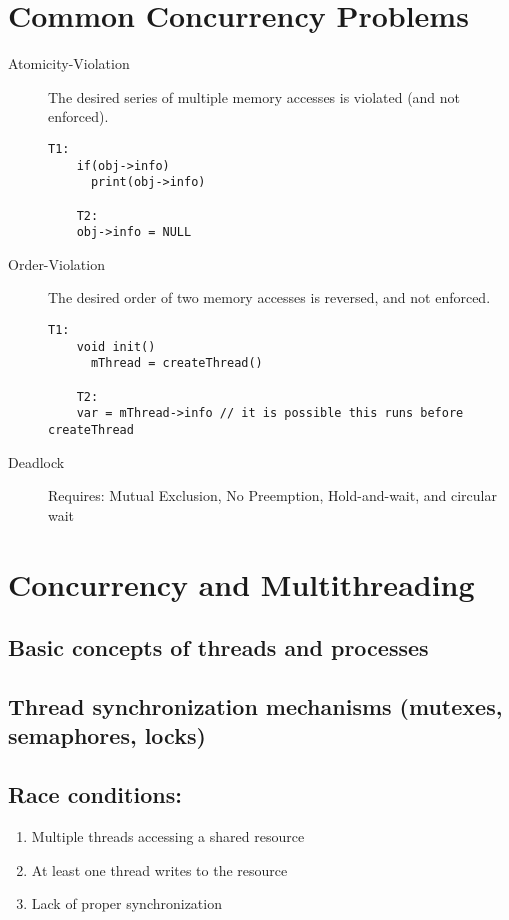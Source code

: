 \documentclass{article}
\begin{document}
\section{Common Concurrency Problems}
    \begin{description}
      \item[Atomicity-Violation] The desired series of multiple memory accesses is violated (and not enforced).
        \begin{lstlisting}[style=cpp]
    T1:
    if(obj->info)
      print(obj->info)

    T2:
    obj->info = NULL
    \end{lstlisting}
    \end{description}
    \begin{description}
      \item[Order-Violation] The desired order of two memory accesses is reversed, and not enforced.
        \begin{lstlisting}[style=cpp]
    T1:
    void init()
      mThread = createThread()

    T2:
    var = mThread->info // it is possible this runs before createThread
    \end{lstlisting}
    \end{description}
    \begin{description}
      \item[Deadlock]
        Requires: Mutual Exclusion, No Preemption, Hold-and-wait, and circular wait
    \end{description}
\section{Concurrency and Multithreading}
    \subsection{ Basic concepts of threads and processes}
    \subsection{ Thread synchronization mechanisms (mutexes, semaphores, locks)}
    \subsection{ Race conditions:}
      \begin{enumerate}
        \item Multiple threads accessing a shared resource
        \item At least one thread writes to the resource
        \item Lack of proper synchronization
      \end{enumerate}
\end{document}

